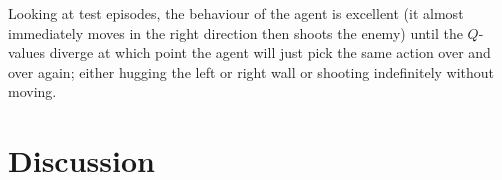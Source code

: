 \documentclass[letterpaper]{article}
\begin{document}
Looking at test episodes, the behaviour of the agent is excellent (it almost
immediately moves in the right direction then shoots the enemy) until the 
$Q$-values diverge at which point the agent will just pick the same action
over and over again; either hugging the left or right wall or shooting 
indefinitely without moving.\\
\section{Discussion}


\footnotesize


\end{document}
